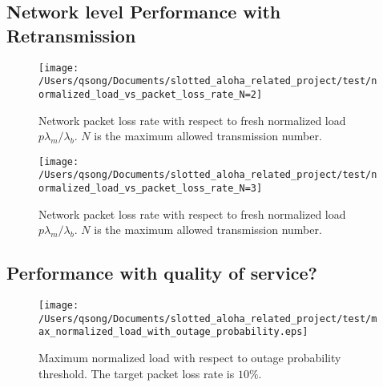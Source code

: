 \subsection{Network level Performance with Retransmission}
\begin{figure}
	\centering
	\texttt{[image: /Users/qsong/Documents/slotted\_aloha\_related\_project/test/normalized\_load\_vs\_packet\_loss\_rate\_N=2]}
	\caption{Network packet loss rate with respect to fresh normalized load $p\lambda_{m}/\lambda_{b}$. $N$ is the maximum allowed transmission number.}
	\label{fig:load_vs_packet_loss_rate_N=2}
\end{figure}

\begin{figure}
	\centering
	\texttt{[image: /Users/qsong/Documents/slotted\_aloha\_related\_project/test/normalized\_load\_vs\_packet\_loss\_rate\_N=3]}
	\caption{Network packet loss rate with respect to fresh normalized load $p\lambda_{m}/\lambda_{b}$. $N$ is the maximum allowed transmission number.}
	\label{fig:load_vs_packet_loss_rate_N=3}
\end{figure}

\subsection{Performance with quality of service?}
\begin{figure}
	\centering
	\texttt{[image: /Users/qsong/Documents/slotted\_aloha\_related\_project/test/max\_normalized\_load\_with\_outage\_probability.eps]}
	\caption{ Maximum normalized load with respect to outage probability threshold. The target packet loss rate is $10\%$.}
	\label{fig:max_normalized_load_with_outage_probability}
\end{figure}






